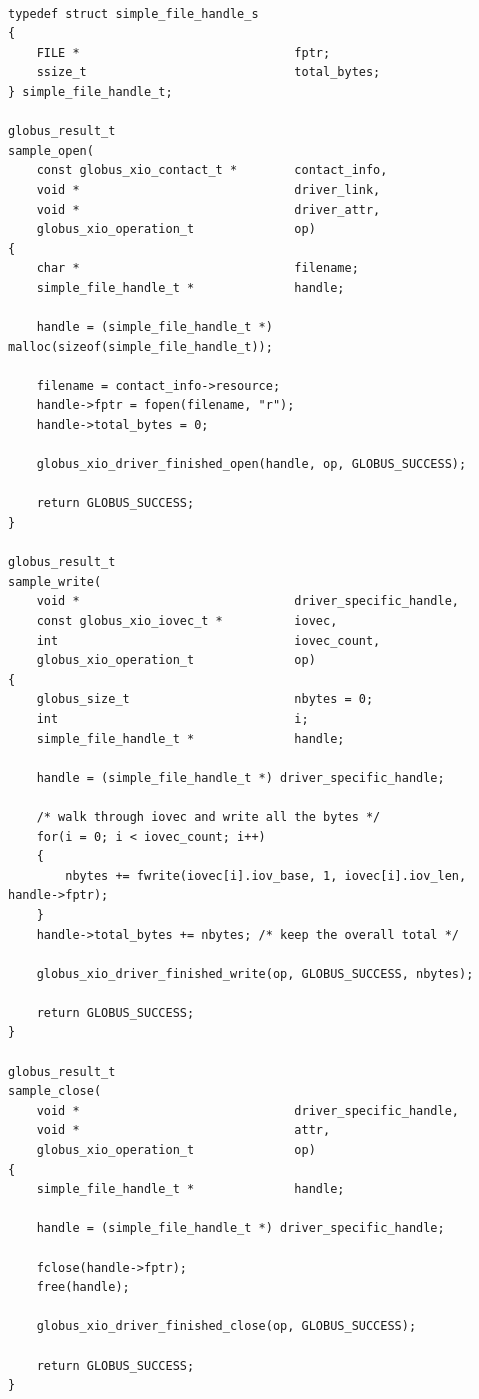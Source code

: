 \documentclass[11pt]{article}
\begin{document}
\begin{verbatim}

typedef struct simple_file_handle_s
{
    FILE *                              fptr;
    ssize_t                             total_bytes;
} simple_file_handle_t;

globus_result_t
sample_open(
    const globus_xio_contact_t *        contact_info,
    void *                              driver_link,
    void *                              driver_attr,
    globus_xio_operation_t              op)
{
    char *                              filename;
    simple_file_handle_t *              handle;

    handle = (simple_file_handle_t *) malloc(sizeof(simple_file_handle_t));

    filename = contact_info->resource;
    handle->fptr = fopen(filename, "r");
    handle->total_bytes = 0;
                   
    globus_xio_driver_finished_open(handle, op, GLOBUS_SUCCESS);

    return GLOBUS_SUCCESS;
}

globus_result_t
sample_write(
    void *                              driver_specific_handle,
    const globus_xio_iovec_t *          iovec,
    int                                 iovec_count,
    globus_xio_operation_t              op)
{
    globus_size_t                       nbytes = 0;
    int                                 i;
    simple_file_handle_t *              handle;

    handle = (simple_file_handle_t *) driver_specific_handle;

    /* walk through iovec and write all the bytes */
    for(i = 0; i < iovec_count; i++)
    {
        nbytes += fwrite(iovec[i].iov_base, 1, iovec[i].iov_len, handle->fptr);
    }
    handle->total_bytes += nbytes; /* keep the overall total */

    globus_xio_driver_finished_write(op, GLOBUS_SUCCESS, nbytes);

    return GLOBUS_SUCCESS;
}

globus_result_t
sample_close(
    void *                              driver_specific_handle,
    void *                              attr,
    globus_xio_operation_t              op)
{
    simple_file_handle_t *              handle;

    handle = (simple_file_handle_t *) driver_specific_handle;

    fclose(handle->fptr);
    free(handle);

    globus_xio_driver_finished_close(op, GLOBUS_SUCCESS);

    return GLOBUS_SUCCESS;
}


\end{verbatim}
\end{document}
